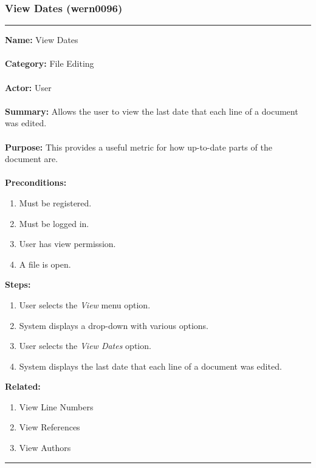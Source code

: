 \documentclass[11pt]{report}
\begin{document}
\subsubsection{View Dates (wern0096)}
\vspace{2pt}
\hrule
\vspace{8pt}
	\noindent\textbf{Name:} View Dates \\ \\
	\textbf{Category:} File Editing \\ \\
	\textbf{Actor:} User \\ \\
	\textbf{Summary:} Allows the user to view the last date that each line of a document was edited. \\ \\
	\textbf{Purpose:} This provides a useful metric for how up-to-date parts of the document are. \\ \\
	\textbf{Preconditions:} 
	\begin{enumerate}
		\item Must be registered.
		\item Must be logged in.
		\item User has view permission.
		\item A file is open.
	\end{enumerate}
	\textbf{Steps:}
	\begin{enumerate}
		\item User selects the \textit{View} menu option.
		\item System displays a drop-down with various options.
		\item User selects the \textit{View Dates} option.
		\item System displays the last date that each line of a document was edited.
	\end{enumerate}
	\textbf{Related:}
	\begin{enumerate}
		\item View Line Numbers
		\item View References
		\item View Authors
	\end{enumerate}
\hrule
\vspace{8pt}

\newpage
\end{document}
